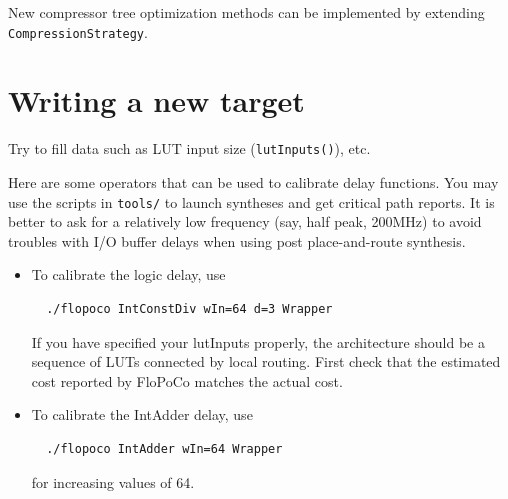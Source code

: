 \documentclass{article}
\begin{document}
New compressor tree optimization methods can be implemented  by extending \texttt{CompressionStrategy}.



\section{Writing a new target}
Try to fill data such as LUT input size (\texttt{lutInputs()}), etc.

Here are some operators that can be used to calibrate delay functions.
You may use the scripts in \texttt{tools/} to launch syntheses and get critical path reports.
It is better to ask for a relatively low frequency (say, half peak, 200MHz) to avoid troubles with I/O buffer delays when using post place-and-route synthesis.

\begin{itemize}
\item To calibrate the logic delay, use 
\begin{verbatim}
  ./flopoco IntConstDiv wIn=64 d=3 Wrapper
\end{verbatim}
  If you have specified your lutInputs properly, the architecture should be a sequence of LUTs connected by local routing.
  First check that the estimated cost reported by FloPoCo matches the actual cost. 
  
\item To calibrate the IntAdder delay, use
\begin{verbatim}
  ./flopoco IntAdder wIn=64 Wrapper
\end{verbatim}
  for increasing values of 64.
  
\end{itemize}




\end{document}
